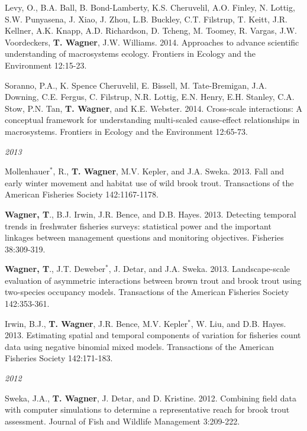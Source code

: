 \documentclass[10pt]{article}
\begin{document}
\begin{flushleft}
\begin{etaremune}[start=41]
\item Levy, O., B.A. Ball, B. Bond-Lamberty, K.S. Cheruvelil,  A.O. Finley, N. Lottig, S.W. Punyasena, J. Xiao, J. Zhou, L.B. Buckley, C.T. Filstrup, T. Keitt, J.R. Kellner, A.K. Knapp, A.D. Richardson, D. Tcheng, M. Toomey, R. Vargas, J.W. Voordeckers, {\bf T.  Wagner}, J.W. Williams. 2014. Approaches to advance scientific understanding of macrosystems ecology. Frontiers in Ecology and the Environment 12:15-23. 

\item Soranno, P.A., K. Spence Cheruvelil, E. Bissell, M. Tate-Bremigan, J.A. Downing, C.E. Fergus, C. Filstrup, N.R. Lottig, E.N. Henry, E.H. Stanley, C.A. Stow, P.N. Tan, {\bf T. Wagner}, and K.E. Webster. 2014. Cross-scale interactions: A conceptual framework for understanding multi-scaled cause-effect relationships in macrosystems. Frontiers in Ecology and the Environment 12:65-73. 

\end{etaremune}
\emph{2013}
\begin{etaremune}[start=28]
\item Mollenhauer$^*$, R., {\bf T. Wagner}, M.V. Kepler, and J.A. Sweka. 2013. Fall and early winter movement and habitat use of wild brook trout. Transactions of the American Fisheries Society 142:1167-1178.

\item {\bf Wagner, T}., B.J. Irwin, J.R. Bence, and D.B. Hayes. 2013. Detecting temporal trends in freshwater fisheries surveys: statistical power and the important linkages between management questions and monitoring objectives. Fisheries 38:309-319.

\item {\bf Wagner, T}., J.T. Deweber$^*$, J. Detar, and J.A. Sweka. 2013. Landscape-scale evaluation of asymmetric interactions between brown trout and brook trout using two-species occupancy models. Transactions of the American Fisheries Society 142:353-361.

\item Irwin, B.J., {\bf T. Wagner}, J.R. Bence, M.V. Kepler$^*$, W. Liu, and D.B. Hayes. 2013. Estimating spatial and temporal components of variation for fisheries count data using negative binomial mixed models. Transactions of the American Fisheries Society 142:171-183.

\end{etaremune}
\emph{2012}
\begin{etaremune}[start=24]
\item Sweka, J.A., {\bf T. Wagner}, J. Detar, and D. Kristine. 2012. Combining field data with computer simulations to determine a representative reach for brook trout assessment. Journal of Fish and Wildlife Management 3:209-222.


\end{etaremune}
\end{flushleft}
\end{document}
